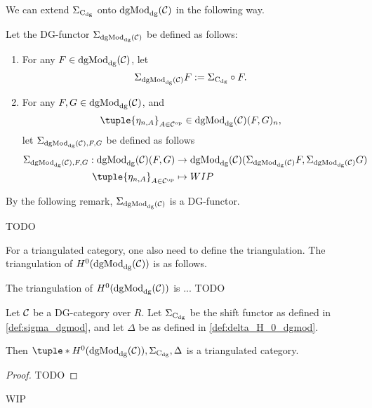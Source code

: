 We can extend \( \Sigma_{\operatorname{C}_{\operatorname{dg}}} \) onto \( \operatorname{dgMod}_{\operatorname{dg}}({\mathcal{C}}) \) in the following way.

\begin{definition}
    \label{def:sigma_dgmod}
    Let the DG-functor \( \Sigma_{\operatorname{dgMod}_{\operatorname{dg}}({\mathcal{C}})} \) be defined as follows:
    \begin{enumerate}
        \item {
            For any \( F \in \operatorname{dgMod}_{\operatorname{dg}}({\mathcal{C}}) \), let
            \[
                \Sigma_{\operatorname{dgMod}_{\operatorname{dg}}({\mathcal{C}})} F := \Sigma_{\operatorname{C}_{\operatorname{dg}}} \circ F.
            \]
        }
        \item {
            For any \( F, G \in \operatorname{dgMod}_{\operatorname{dg}}({\mathcal{C}}) \), and
            \[
                \tuple{\eta_{n, A}}_{A \in \Cc^{\op}} \in \dgMod_{\dg}(\Cc)(F, G)_n,
            \]
            let \( \Sigma_{\operatorname{dgMod}_{\operatorname{dg}}({\mathcal{C}}), F, G} \) be defined as follows
            \begin{align*}
                \Sigma_{\dgMod_{\dg}(\Cc), F, G}: \dgMod_{\dg}(\Cc)(F, G) &\to \dgMod_{\dg}(\Cc)(\Sigma_{\dgMod_{\dg}(\Cc)} F, \Sigma_{\dgMod_{\dg}(\Cc)} G) \\
                \tuple{\eta_{n, A}}_{A \in \Cc^{\op}} &\mapsto WIP
            \end{align*}
        }
    \end{enumerate}
\end{definition}

By the following remark, \( \Sigma_{\operatorname{dgMod}_{\operatorname{dg}}({\mathcal{C}})} \) is a DG-functor.

\begin{remark}
    TODO
\end{remark}

For a triangulated category, one also need to define the triangulation. The triangulation of \( H^0(\operatorname{dgMod}_{\operatorname{dg}}({\mathcal{C}})) \) is as follows.
\begin{definition}
    \label{def:delta_H_0_dgmod}
    The triangulation of \( H^0(\operatorname{dgMod}_{\operatorname{dg}}({\mathcal{C}})) \) is ... TODO
\end{definition}

\begin{theorem}
    Let \( {\mathcal{C}} \) be a DG-category over \( R \). Let \( \Sigma_{\operatorname{C}_{\operatorname{dg}}} \) be the shift functor as defined in \autoref{def:sigma_dgmod}, and let \( \Delta \) be as defined in \autoref{def:delta_H_0_dgmod}.

    Then \( \tuple*{H^0(\dgMod_{\dg}(\Cc)), \Sigma_{\C_{\dg}}, \Delta} \) is a triangulated category.
\end{theorem}
\begin{proof}
    TODO
\end{proof}

WIP